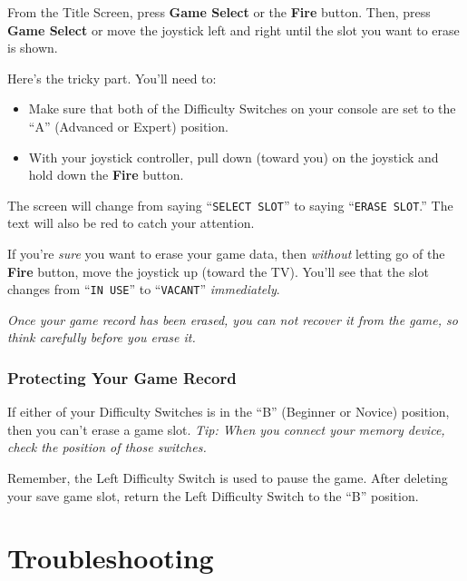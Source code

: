 \documentclass[10pt,twocolumn,openany,article]{memoir}
\begin{document}
From the  Title Screen, press  \textbf{Game Select} or the  \textbf{Fire} button.
Then, press  \textbf{Game Select}  or move the  joystick left  and right
until the slot you want to erase is shown.

Here's the tricky part. You'll need to:

\begin{itemize}
\item Make sure that both of the Difficulty Switches on your console
  are set to the ``A'' (Advanced or Expert) position.
\item With your joystick controller, pull down (toward you) on the
  joystick and hold down the \textbf{Fire} button.
\end{itemize}

The screen  will change from  saying ``\texttt{SELECT SLOT}''  to saying
``\texttt{ERASE  SLOT}.''   The  text   will  also   be  red   to  catch
your attention.

If  you're  \emph{sure}   you  want  to  erase  your   game  data,  then
\emph{without}  letting go  of the  \textbf{Fire}  button, move  the joystick  up
(toward  the TV).  You'll see  that the  slot changes  from ``\texttt{IN
  USE}'' to ``\texttt{VACANT}'' \emph{immediately}.

\emph{Once your game record has been erased, you can not recover it from
  the game, so think carefully before you erase it.}

\subsection{Protecting Your Game Record}

If  either of  your Difficulty  Switches is  in the  ``B'' (Beginner  or
Novice) position, then you can't erase  a game slot. \emph{Tip: When you
  connect your memory device, check the position of those switches.}

\ifdefined\TVSECAM

Remember,  the  Left  Difficulty  Switch  is used  to  pause  the  game.
After deleting your save game slot, return the Left Difficulty Switch to
the ``B'' position.

\fi

\fi %

\chapter{Troubleshooting}

\ifdefined\DEMO
\end{document}
